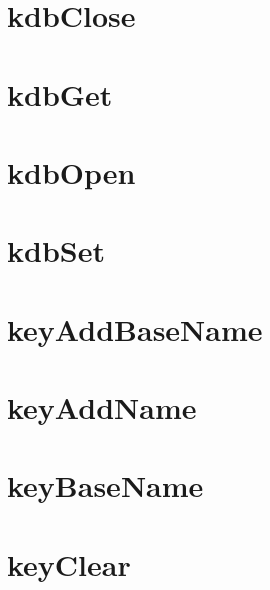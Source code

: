 \let\mypdfximage\pdfximage\def\pdfximage{\immediate\mypdfximage}\documentclass[twoside]{book}
\newcommand{\+}{\discretionary{\mbox{\scriptsize$\hookleftarrow$}}{}{}}
\begin{document}
\chapter{kdb\+Close}
\label{doc_contrib_api_reviews_core_kdbClose_md}

\chapter{kdb\+Get}
\label{doc_contrib_api_reviews_core_kdbGet_md}

\chapter{kdb\+Open}
\label{doc_contrib_api_reviews_core_kdbOpen_md}

\chapter{kdb\+Set}
\label{doc_contrib_api_reviews_core_kdbSet_md}

\chapter{key\+Add\+Base\+Name}
\label{doc_contrib_api_reviews_core_keyAddBaseName_md}

\chapter{key\+Add\+Name}
\label{doc_contrib_api_reviews_core_keyAddName_md}

\chapter{key\+Base\+Name}
\label{doc_contrib_api_reviews_core_keyBaseName_md}

\chapter{key\+Clear}
\label{doc_contrib_api_reviews_core_keyClear_md}

\end{document}
